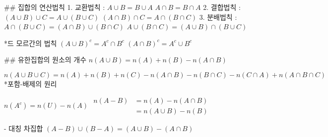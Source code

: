 ## 집합의 연산법칙
1. 교환법칙 :
$A \cup B = B \cup A$
$A \cap B = B \cap A$
2. 결합법칙 :
$(A \cup B) \cup C = A \cup (B \cup C)$
$(A \cap B) \cap C = A \cap (B \cap C)$
3. 분배법칙 :
$A \cap (B \cup C) = (A \cap B) \cup (B \cap C)$
$A \cup (B \cap C) = (A \cup B) \cap (B \cup C)$

*드 모르간의 법칙
$(A \cup B)^{c} = A^{c} \cap B^{c}$
$(A \cap B)^{c} = A^{c} \cup B^{c}$

## 유한집합의 원소의 개수
$n(A \cup B) = n(A) + n(B) - n(A \cap B)$

$n(A \cup B \cup C) = n(A) + n(B) + n(C) - n(A \cap B) - n(B \cap C) - n(C \cap A) + n(A \cap B \cap C)$
*포함-배제의 원리

$n(A^{c}) = n(U) - n(A)$
${\displaystyle {\begin{aligned}
n(A-B) &= n(A) - n(A \cap B)\\&=n(A \cup B)-n(B)\end{aligned}}}$

- 대칭 차집합
$(A-B) \cup (B-A) = (A \cup B) - (A \cap B)$
